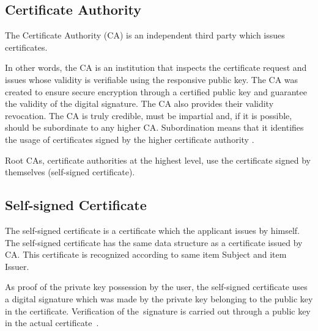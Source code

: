 \documentclass[
  twoside, 12pt, 
  printed, %
  notable,   %
  lof,     %
  lot,     %
]{fithesis3}
\begin{document}
\subsection{Certificate Authority}
The Certificate Authority (CA) is an independent third party which issues certificates.

In other words, the CA is an institution that inspects the certificate request and issues whose 
validity is verifiable using the responsive public key. The CA was created %
to ensure secure encryption through a certified public key and guarantee the validity of the 
digital signature. The CA also provides their validity revocation. The CA is truly credible, must 
be impartial and, if it is possible, should be subordinate to any higher CA. Subordination means 
that it identifies the usage of certificates signed by the higher certificate authority 
\cite{dostalek2016velky}.

Root CAs, certificate authorities at the highest level, use the certificate signed by 
themselves (self-signed certificate).

\nocite{singh2003kniha}

\subsection{Self-signed Certificate}
The self-signed certificate is a certificate which the applicant issues by himself. The 
self-signed certificate has the same data structure as a certificate issued by CA. This 
certificate is recognized according to same item Subject and item Issuer.

As proof of the private key possession by the user, the self-signed certificate uses a 
digital signature which was made by the private key belonging to the public key 
in the certificate. Verification of the~signature is carried out through a public key in the 
actual certificate~\cite{dostalek2016velky}.

\end{document}
